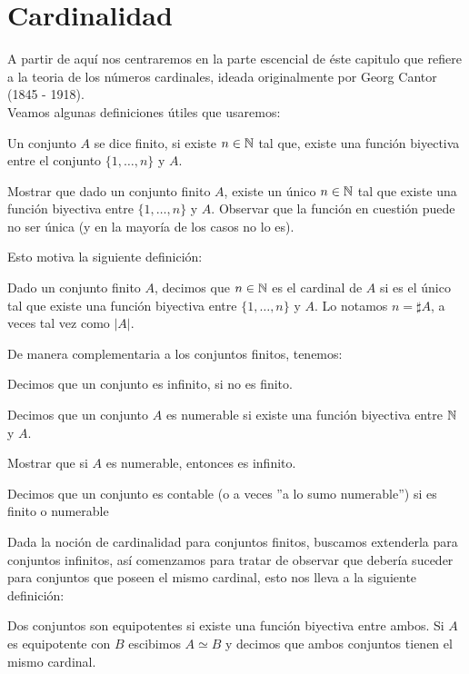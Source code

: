 \documentclass[12pt,a4paper]{book}
\begin{document}
\else
\fi

\section{Cardinalidad}

A partir de aquí nos centraremos en la parte escencial de éste capitulo que refiere a la teoria de los números cardinales, ideada originalmente por Georg Cantor (1845 - 1918).\\[0.5cm]
Veamos algunas definiciones útiles que usaremos:
\begin{defi}
Un conjunto $A$ se dice finito, si existe $n \in \mathbb{N}$ tal que, existe una función biyectiva entre el conjunto $\{ 1, \ldots ,n\}$ y $A$.
\end{defi}
\begin{ej}
Mostrar que dado un conjunto finito $A$, existe un único $n \in \mathbb{N}$ tal que existe una función biyectiva entre $\{1, \ldots, n\}$ y $A$. Observar que la función en cuestión puede no ser única (y en la mayoría de los casos no lo es).
\end{ej}
Esto motiva la siguiente definición:
\begin{defi}
Dado un conjunto finito $A$, decimos que $n \in \mathbb{N}$ es el cardinal de $A$ si es el único tal que existe una función biyectiva entre $\{1, \ldots, n\}$ y $A$. Lo notamos $n = \sharp A$, a veces tal vez como $|A|$.
\end{defi}
De manera complementaria a los conjuntos finitos, tenemos:
\begin{defi}
Decimos que un conjunto es infinito, si no es finito.
\end{defi}
\begin{defi}
Decimos que un conjunto $A$ es numerable si existe una función biyectiva entre $\mathbb{N}$ y $A$.
\end{defi}
\begin{ej}
Mostrar que si $A$ es numerable, entonces es infinito.
\end{ej}
\begin{defi}
Decimos que un conjunto es contable (o a veces ''a lo sumo numerable'') si es finito o numerable
\end{defi}
Dada la noción de cardinalidad para conjuntos finitos, buscamos extenderla para conjuntos infinitos, así comenzamos para tratar de observar que debería suceder para conjuntos que poseen el mismo cardinal, esto nos lleva a la siguiente definición:
\begin{defi}
Dos conjuntos son equipotentes si existe una función biyectiva entre ambos. Si $A$ es equipotente con $B$ escibimos $ A \simeq B$ y decimos que ambos conjuntos tienen el mismo cardinal.
\end{defi}
\end{document}
